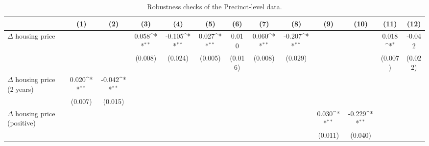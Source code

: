\begin{sidewaystable}[htbp]\centering
\def\sym#1{\ifmmode^{#1}\else\(^{#1}\)\fi}
\caption{Robustness checks of the Precinct-level data.} \footnotesize \label{apdxprerobust}
\begin{tabular}{l*{12}{c}}
\hline\hline
                    &\multicolumn{1}{c}{(1)}        &\multicolumn{1}{c}{(2)}        &\multicolumn{1}{c}{(3)}        &\multicolumn{1}{c}{(4)}        &\multicolumn{1}{c}{(5)}        &\multicolumn{1}{c}{(6)}        &\multicolumn{1}{c}{(7)}        &\multicolumn{1}{c}{(8)}        &\multicolumn{1}{c}{(9)}        &\multicolumn{1}{c}{(10)}        &\multicolumn{1}{c}{(11)}        &\multicolumn{1}{c}{(12)}        \\
\hline
$\Delta$ housing price&                    &                    &       0.058\sym{**}&      -0.105\sym{**}&       0.027\sym{**}&       0.010        &       0.060\sym{**}&      -0.207\sym{**}&                    &                    &       0.018\sym{*} &      -0.042        \\
                    &                    &                    &     (0.008)        &     (0.024)        &     (0.005)        &     (0.016)        &     (0.008)        &     (0.029)        &                    &                    &     (0.007)        &     (0.022)        \\
$\Delta$ housing price (2 years)&       0.020\sym{**}&      -0.042\sym{**}&                    &                    &                    &                    &                    &                    &                    &                    &                    &                    \\
                    &     (0.007)        &     (0.015)        &                    &                    &                    &                    &                    &                    &                    &                    &                    &                    \\
$\Delta$ housing price (positive)&                    &                    &                    &                    &                    &                    &                    &                    &       0.030\sym{**}&      -0.229\sym{**}&                    &                    \\
                    &                    &                    &                    &                    &                    &                    &                    &                    &     (0.011)        &     (0.040)        &                    &                    \\

\end{tabular}
\end{sidewaystable}
